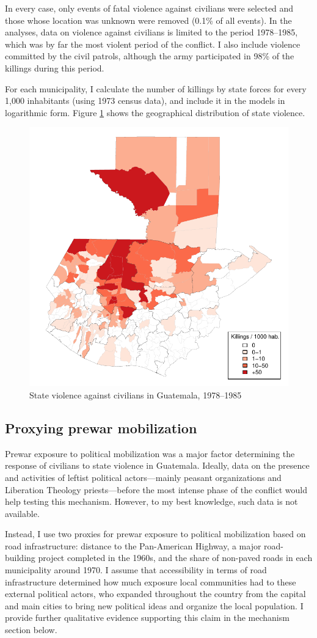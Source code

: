 \documentclass[12pt, notitlepage]{article}
\begin{document}
In every case, only events of fatal violence against civilians were selected and those whose location was unknown were removed (0.1\% of all events).
In the analyses, data on violence against civilians is limited to the period 1978--1985, which was by far the most violent period of the conflict.%
I also include violence committed by the civil patrols, although the army participated in 98\% of the killings during this period.

For each municipality, I calculate the number of killings by state forces for every 1,000 inhabitants (using 1973 census data), and include it in the models in logarithmic form.
Figure \ref{fig:map_govt_vi} shows the geographical distribution of state violence.

\begin{figure}[htb!]
  \centering
    \includegraphics[width = .4\textwidth]{img/map_govt_vi}

  \caption{State violence against civilians in Guatemala, 1978--1985} \label{fig:map_govt_vi}

\end{figure}

\subsection*{Proxying prewar mobilization}

Prewar exposure to political mobilization was a major factor determining the response of civilians to state violence in Guatemala.
Ideally, data on the presence and activities of leftist political actors---mainly peasant organizations and Liberation Theology priests---before the most intense phase of the conflict would help testing this mechanism.
However, to my best knowledge, such data is not available.

Instead, I use two proxies for prewar exposure to political mobilization based on road infrastructure: distance to the Pan-American Highway, a major road-building project completed in the 1960s, and the share of non-paved roads in each municipality around 1970.
I assume that accessibility in terms of road infrastructure determined how much exposure local communities had to these external political actors, who expanded throughout the country from the capital and main cities to bring new political ideas and organize the local population.
I provide further qualitative evidence supporting this claim in the mechanism section below.
\end{document}

